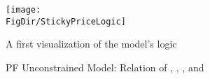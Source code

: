 \begin{figure}[ht]
  \centerline{
    \texttt{[image: \\FigDir/StickyPriceLogic]}
  }
  \caption{PF Unconstrained Model: Relation of \GICRaw, \FHWC, \RIC, and \PFFVAC} \label{fig:StickyPriceLogic}
  \footnotesize{A first visualization of the model's logic}
\end{figure}
